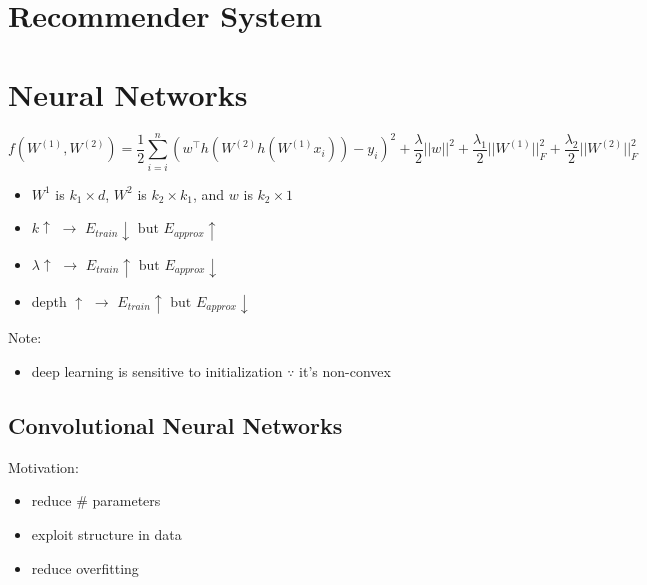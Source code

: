 \documentclass[10pt,landscape,a4paper]{article}
\begin{document}
\begin{multicols*}{5}
\section{Recommender System}

\section{Neural Networks}
\begin{dmath*}
    f(W^{(1)},W^{(2)}) = \frac{1}{2} \sum_{i=i}^{n} (w^\intercal h(W^{(2)}h(W^{(1)}x_i))-y_i)^2 + \frac{\lambda}{2}||w||^2 + \frac{\lambda_1}{2} ||W^{(1)}||_F^2 + \frac{\lambda_2}{2} ||W^{(2)}||_F^2
\end{dmath*}
\begin{itemize}
    \item \(W^1\) is \(k_1 \times d\), \(W^2\) is \(k_2 \times k_1\), and \(w\) is \(k_2 \times 1\)
    \item \(k \uparrow \) \(\rightarrow \) \(E_{train} \downarrow \text{ but } E_{approx} \uparrow \)
    \item \(\lambda \uparrow \) \(\rightarrow \) \(E_{train} \uparrow \text{ but } E_{approx} \downarrow \)
    \item depth \(\uparrow \) \(\rightarrow \) \(E_{train} \uparrow \text{ but } E_{approx} \downarrow \)
\end{itemize}

Note:
\begin{itemize}
    \item deep learning is sensitive to initialization \(\because\) it's non-convex
\end{itemize}

\subsection{Convolutional Neural Networks}
Motivation:
\begin{itemize}
    \item reduce \# parameters
    \item exploit structure in data
    \item reduce overfitting
\end{itemize}


\end{multicols*}
\end{document}
